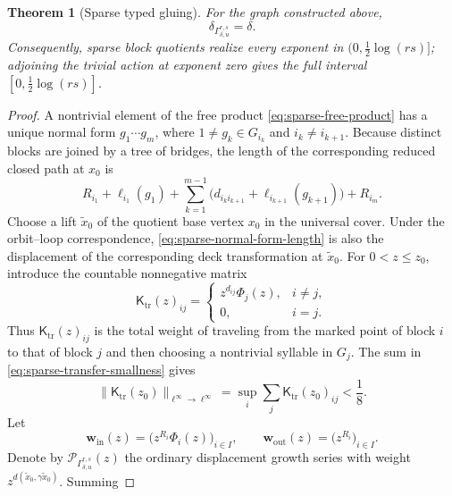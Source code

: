 \documentclass[11pt]{amsart}
\theoremstyle{plain}
\newtheorem{theorem}{Theorem}[section]
\theoremstyle{definition}
\theoremstyle{remark}
\begin{document}
\begin{theorem}[Sparse typed gluing]
\label{thm:sparse-full}
For the graph constructed above,
\[
  \delta_{\Gamma_{\delta,u}^{r,s}}=\delta.
\]
Consequently, sparse block quotients realize every exponent in
\((0,\frac12\log(rs)]\); adjoining the trivial action at exponent zero
gives the full interval \([0,\frac12\log(rs)]\).
\end{theorem}

\begin{proof}
A nontrivial element of the free product
\eqref{eq:sparse-free-product} has a unique normal form
\(g_1\cdots g_m\), where
\(1\neq g_k\in G_{i_k}\) and \(i_k\neq i_{k+1}\).  Because distinct blocks
are joined by a tree of bridges, the length of the corresponding reduced
closed path at \(x_0\) is
\begin{equation}\label{eq:sparse-normal-form-length}
  R_{i_1}+\ell_{i_1}(g_1)
  +\sum_{k=1}^{m-1}
    \bigl(d_{i_k i_{k+1}}+\ell_{i_{k+1}}(g_{k+1})\bigr)
  +R_{i_m}.
\end{equation}
Choose a lift \(\widetilde x_0\) of the quotient base vertex \(x_0\) in the
universal cover.  Under the orbit--loop correspondence,
\eqref{eq:sparse-normal-form-length} is also the displacement of the
corresponding deck transformation at \(\widetilde x_0\).
For \(0<z\leq z_0\), introduce the countable nonnegative matrix
\begin{equation}\label{eq:sparse-transfer-kernel}
  \mathsf K_{\mathrm{tr}}(z)_{ij}
  =\begin{cases}
     z^{d_{ij}}\Phi_j(z),&i\neq j,\\
     0,&i=j.
   \end{cases}
\end{equation}
Thus \(\mathsf K_{\mathrm{tr}}(z)_{ij}\) is the total weight of traveling
from the marked point of
block \(i\) to that of block \(j\) and then choosing a nontrivial syllable in
\(G_j\).
The sum in \eqref{eq:sparse-transfer-smallness} gives
\begin{equation}\label{eq:sparse-kernel-bound}
  \lVert \mathsf K_{\mathrm{tr}}(z_0)\rVert_{\ell^\infty\to\ell^\infty}
  =\sup_i\sum_j\mathsf K_{\mathrm{tr}}(z_0)_{ij}<\frac18.
\end{equation}
Let
\[
  \mathbf w_{\mathrm{in}}(z)
    =\bigl(z^{R_i}\Phi_i(z)\bigr)_{i\in I},
  \qquad
  \mathbf w_{\mathrm{out}}(z)
    =\bigl(z^{R_i}\bigr)_{i\in I}.
\]
Denote by \(\mathcal P_{\Gamma_{\delta,u}^{r,s}}(z)\) the ordinary
displacement growth series with weight
\(z^{d(\widetilde x_0,\gamma\widetilde x_0)}\).  Summing

\end{proof}
\end{document}
